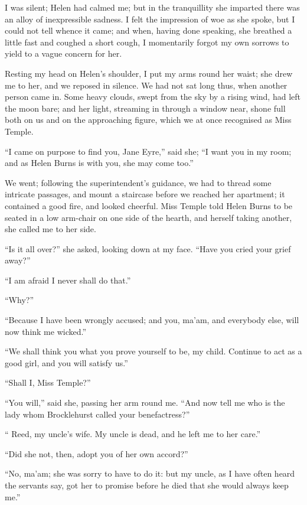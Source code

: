 I was silent; Helen had calmed me; but in the tranquillity she imparted
there was an alloy of inexpressible sadness. I felt the impression of
woe as she spoke, but I could not tell whence it came; and when, having
done speaking, she breathed a little fast and coughed a short cough, I
momentarily forgot my own sorrows to yield to a vague concern for her.

Resting my head on Helen's shoulder, I put my arms round her waist; she
drew me to her, and we reposed in silence. We had not sat long thus,
when another person came in. Some heavy clouds, swept from the sky by a
rising wind, had left the moon bare; and her light, streaming in through
a window near, shone full both on us and on the approaching figure,
which we at once recognised as Miss Temple.

\enquote{I came on purpose to find you, Jane Eyre,} said she; \enquote{I
want you in my room; and as Helen Burns is with you, she may come too.}

We went; following the superintendent's guidance, we had to thread some
intricate passages, and mount a staircase before we reached her
apartment; it contained a good fire, and looked cheerful. Miss Temple
told Helen Burns to be seated in a low arm-chair on one side of the
hearth, and herself taking another, she called me to her side.

\enquote{Is it all over?} she asked, looking down at my face. 
\enquote{Have you cried your grief away?}

\enquote{I am afraid I never shall do that.}

\enquote{Why?}

\enquote{Because I have been wrongly accused; and you, ma'am, and
everybody else, will now think me wicked.}

\enquote{We shall think you what you prove yourself to be, my child. 
Continue to act as a good girl, and you will satisfy us.}

\enquote{Shall I, Miss Temple?}

\enquote{You will,} said she, passing her arm round me. \enquote{And
now tell me who is the lady whom \Mr{} Brocklehurst called your
benefactress?}

\enquote{\Mrs{} Reed, my uncle's wife. My uncle is dead, and he left me
to her care.}

\enquote{Did she not, then, adopt you of her own accord?}

\enquote{No, ma'am; she was sorry to have to do it: but my uncle, as I
have often heard the servants say, got her to promise before he died
that she would always keep me.}

